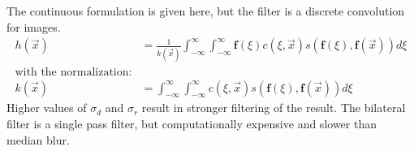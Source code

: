The continuous formulation is given here, but the filter is a discrete convolution for images.
\begin{equation}
\begin{aligned}
    h(\vec{x}) &= \frac{1}{k(\vec{x})} \int_{-\infty}^{\infty} \int_{-\infty}^{\infty} \mathbf{f}(\xi) c(\xi, \vec{x}) s(\mathbf{f}(\xi), \mathbf{f}(\vec{x})) d\xi \\
    \text{with the normalization:} \\
    k(\vec{x}) &= \int_{-\infty}^{\infty} \int_{-\infty}^{\infty} c(\xi, \vec{x}) s(\mathbf{f}(\xi), \mathbf{f}(\vec{x})) d\xi
\end{aligned}
\end{equation}
Higher values of $\sigma_d$ and $\sigma_r$ result in stronger filtering of the result.
The bilateral filter is a single pass filter, but computationally expensive and slower than median blur.

